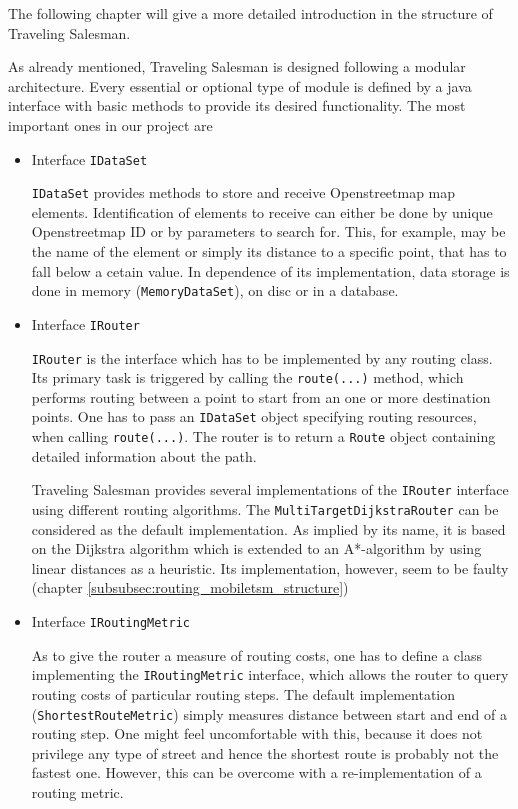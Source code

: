 The following chapter will give a more detailed introduction in the structure of Traveling Salesman.\newline

As already mentioned, Traveling Salesman is designed following a modular architecture. Every essential or optional type of module is defined by a java interface with basic methods to provide its desired functionality. The most important ones in our project are

\begin{itemize}

	\item Interface \texttt{IDataSet}
	
		\texttt{IDataSet} provides methods to store and receive Openstreetmap map elements. Identification of elements to receive can either be done by unique Openstreetmap ID or by parameters to search for. This, for example, may be the name of the element or simply its distance to a specific point, that has to fall below a cetain value.\newline
		 In dependence of its implementation, data storage is done in memory (\texttt{MemoryDataSet}), on disc or in a database.
	
	\item Interface \texttt{IRouter}

		\texttt{IRouter} is the interface which has to be implemented by any routing class. Its primary task is triggered by calling the \texttt{route(...)} method, which performs routing between a point to start from an one or more destination points. One has to pass an \texttt{IDataSet} object specifying routing resources, when calling \texttt{route(...)}. The router is to return a \texttt{Route} object containing detailed information about the path.\newline
		
		Traveling Salesman provides several implementations of the \texttt{IRouter} interface using different routing algorithms. The \texttt{MultiTargetDijkstraRouter} can be considered as the default implementation. As implied by its name, it is based on the Dijkstra algorithm which is extended to an A*-algorithm by using linear distances as a heuristic. Its implementation, however, seem to be faulty (chapter \ref{subsubsec:routing_mobiletsm_structure})\newline
			
	\item Interface \texttt{IRoutingMetric}
	
		As to give the router a  measure of routing costs, one has to define a class implementing the \texttt{IRoutingMetric} interface, which allows the router to query routing costs of particular routing steps.\newline
		The default implementation (\texttt{ShortestRouteMetric}) simply measures distance between start and end of a routing step. One might feel uncomfortable with this, because it does not privilege any type of street and hence the shortest route is probably not the fastest one. However, this can be overcome with a re-implementation of a routing metric.
	
\end{itemize}

